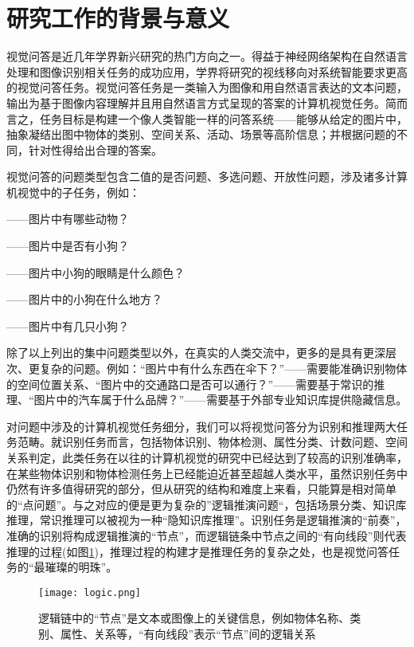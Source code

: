 \thesischapterexordium

\section{研究工作的背景与意义}

视觉问答是近几年学界新兴研究的热门方向之一。得益于神经网络架构在自然语言处理和图像识别相关任务的成功应用，学界将研究的视线移向对系统智能要求更高的视觉问答任务。视觉问答任务是一类输入为图像和用自然语言表达的文本问题，输出为基于图像内容理解并且用自然语言方式呈现的答案的计算机视觉任务。简而言之，任务目标是构建一个像人类智能一样的问答系统——能够从给定的图片中，抽象凝结出图中物体的类别、空间关系、活动、场景等高阶信息；并根据问题的不同，针对性得给出合理的答案。

视觉问答的问题类型包含二值的是否问题、多选问题、开放性问题，涉及诸多计算机视觉中的子任务，例如：
\begin{description}[labelindent=2em, leftmargin=6em, style=sameline]
\item [物体识别]——图片中有哪些动物？
\item [物体检测]——图片中是否有小狗？
\item [属性分类]——图片中小狗的眼睛是什么颜色？
\item [场景分类]——图片中的小狗在什么地方？
\item [计数问题]——图片中有几只小狗？
\end{description}
除了以上列出的集中问题类型以外，在真实的人类交流中，更多的是具有更深层次、更复杂的问题。例如：“图片中有什么东西在伞下？”——需要能准确识别物体的空间位置关系、“图片中的交通路口是否可以通行？”——需要基于常识的推理、“图片中的汽车属于什么品牌？”——需要基于外部专业知识库提供隐藏信息。

对问题中涉及的计算机视觉任务细分，我们可以将视觉问答分为识别和推理两大任务范畴。就识别任务而言，包括物体识别、物体检测、属性分类、计数问题、空间关系判定，此类任务在以往的计算机视觉的研究中已经达到了较高的识别准确率，在某些物体识别和物体检测任务上已经能迫近甚至超越人类水平，虽然识别任务中仍然有许多值得研究的部分，但从研究的结构和难度上来看，只能算是相对简单的“点问题”。与之对应的便是更为复杂的”逻辑推演问题“，包括场景分类、知识库推理，常识推理可以被视为一种“隐知识库推理”。识别任务是逻辑推演的“前奏”，准确的识别将构成逻辑推演的“节点”，而逻辑链条中节点之间的“有向线段”则代表推理的过程(如图\ref{logic})，推理过程的构建才是推理任务的复杂之处，也是视觉问答任务的“最璀璨的明珠”。
\begin{figure}[H]
	\texttt{[image: logic.png]}
	\caption{逻辑链中的“节点”是文本或图像上的关键信息，例如物体名称、类别、属性、关系等，“有向线段”表示“节点”间的逻辑关系}
	\label{logic}
\end{figure}

